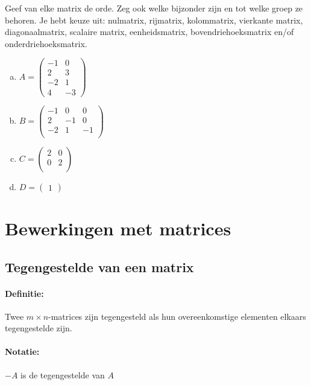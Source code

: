 \documentclass[12pt,twoside]{article}
\begin{document}
\begin{oefening}
  Geef van elke matrix de orde. Zeg ook welke bijzonder zijn en tot welke groep ze behoren. Je hebt keuze uit: nulmatrix, rijmatrix, kolommatrix, vierkante matrix, diagonaalmatrix, scalaire matrix, eenheidsmatrix, bovendriehoeksmatrix en/of onderdriehoeksmatrix.\\
  \begin{enumerate}[(a)]
    \itemsep1em
  \item $
    A=\begin{pmatrix}
      -1 & 0\\
      2 & 3\\
      -2 & 1\\
      4 & -3
    \end{pmatrix}
    $
  \item $
    B=\begin{pmatrix}
      -1 & 0 & 0\\
      2 & -1 & 0\\
      -2 & 1 & -1\\
    \end{pmatrix}
    $
  \item $
    C=\begin{pmatrix}
      2 & 0\\
      0 & 2\\
    \end{pmatrix}
    $
  \item $
    D=\begin{pmatrix}
      1
    \end{pmatrix}
    $
  \end{enumerate}
\end{oefening}

\pagebreak
\section{Bewerkingen met matrices}

\subsection{Tegengestelde van een matrix}

\paragraph*{Definitie:} Twee $m \times n$-matrices zijn tegengesteld als hun overeenkomstige elementen elkaars tegengestelde zijn.

\paragraph*{Notatie:} $-A$ is de tegengestelde van $A$
\end{document}
